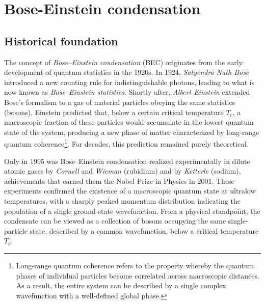 \chapter{Bose-Einstein condensation} 
\label{chapter3}
\section{Historical foundation} %
The concept of \textit{Bose--Einstein condensation} (BEC) originates from the early development of quantum statistics in the 1920s.  
In 1924, \textit{Satyendra Nath Bose} introduced a new counting rule for indistinguishable photons, leading to what is now known as \textit{Bose--Einstein statistics}.  
Shortly after, \textit{Albert Einstein} extended Bose's formalism to a gas of material particles obeying the same statistics (bosons).  
Einstein predicted that, below a certain critical temperature \( T_c \), a macroscopic fraction of these particles would accumulate in the lowest quantum state of the system, producing a new phase of matter characterized by long-range quantum coherence\footnote{%
Long-range quantum coherence refers to the property whereby the quantum phases of individual particles become correlated across macroscopic distances.  
As a result, the entire system can be described by a single complex wavefunction with a well-defined global phase.}.  
For decades, this prediction remained purely theoretical.

Only in 1995 was Bose--Einstein condensation realized experimentally in dilute atomic gases by \textit{Cornell} and \textit{Wieman} (rubidium) and by \textit{Ketterle} (sodium), achievements that earned them the Nobel Prize in Physics in 2001.  
These experiments confirmed the existence of a macroscopic quantum state at ultralow temperatures, with a sharply peaked momentum distribution indicating the population of a single ground-state wavefunction.  
From a physical standpoint, the condensate can be viewed as a collection of bosons occupying the same single-particle state, described by a common wavefunction, below a critical temperature \( T_c \).  


